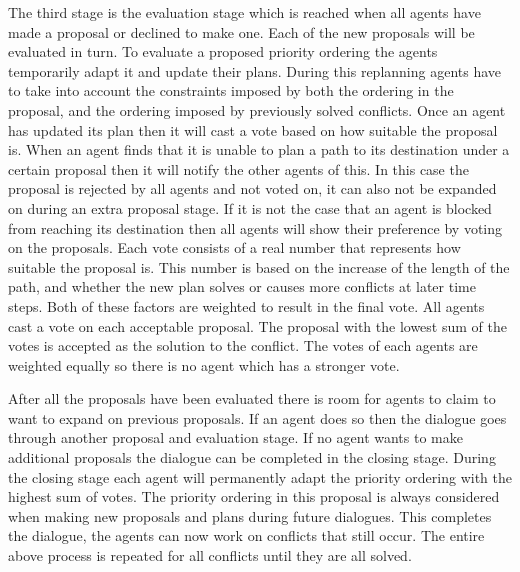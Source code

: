 The third stage is the evaluation stage which is reached when all agents have
made a proposal or declined to make one. Each of the new proposals will be
evaluated in turn. To evaluate a proposed priority ordering the agents 
temporarily adapt it
and update their plans. During this replanning agents have to take into account
the constraints imposed by both the ordering in the proposal, and the ordering
imposed by previously solved conflicts. Once an agent has updated its plan then
it will cast a vote based on how suitable the proposal is. When an agent finds
that it is unable to plan a path to its destination under a certain proposal
then it will notify the other agents of this. In this case the proposal is
rejected by all agents and not voted on, it can also not be expanded on during
an extra proposal stage. If it is not the case that an agent is blocked from
reaching its destination then all agents will show their preference by voting 
on the proposals. Each vote consists of a real number that represents how
suitable the proposal is. This number is based on the increase of the length of
the path, and whether the new plan solves or causes more conflicts at later
time steps. Both of these factors are weighted to result in the final vote. All
agents cast a vote on each acceptable proposal. The proposal with the lowest
sum of the votes is accepted as the solution to the conflict. The votes of each
agents are weighted equally so there is no agent which has a stronger vote.

After all the proposals have been evaluated there is room for agents to claim
to want to expand on previous proposals. If an agent does so then the dialogue
goes through another proposal and evaluation stage. If no agent wants to make
additional proposals the dialogue can be completed in the closing stage. During
the closing stage each agent will permanently adapt the priority ordering with
the highest sum of votes. The priority ordering in this proposal is always
considered when making new proposals and plans during future dialogues. This
completes the dialogue, the agents can now work on conflicts that still occur.
The entire above process is repeated for all conflicts until they are all
solved.

